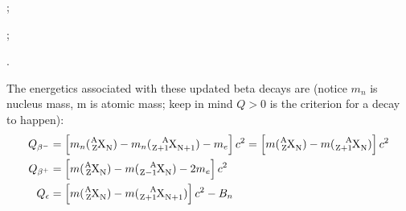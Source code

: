 \documentclass{school-22.101-notes}
\begin{document}
;

;

.

The energetics associated with these updated beta decays are (notice $m_n$ is nucleus mass, m is atomic mass; keep in mind $Q>0$ is the criterion for a decay to happen):
\begin{align}
Q_{\beta^-} &= \left[ m_n (\ce{^A_Z X_N}) - m_n (\ce{^A_{Z+1} X_{N+1}}) - m_e \right] c^2 = \left[ m (\ce{^A_Z X_N}) - m (\ce{^A_{Z+1} X_{N}}) \right] c^2 \\
Q_{\beta^+} &= \left[ m (\ce{^A_Z X_N}) - m (\ce{^A_{Z-1} X_{N}}) - 2m_e \right] c^2 \\
Q_{\epsilon} &= \left[ m (\ce{^A_Z X_N}) - m (\ce{^A_{Z+1} X_{N+1}}) \right] c^2 - B_n 
\end{align}
\end{document}
